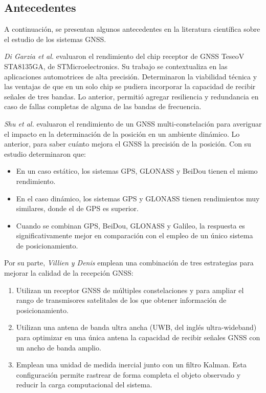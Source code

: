 \subsection{Antecedentes}

A continuación, se presentan algunos antecedentes en la literatura científica sobre el estudio de los sistemas GNSS. 

\textit{Di Garzia et al.} \citep{DiGrazia} evaluaron el rendimiento del chip receptor de GNSS TeseoV STA8135GA, de STMicroelectronics. Su trabajo se contextualiza en las aplicaciones automotrices de alta precisión. Determinaron la viabilidad técnica y las ventajas de que en un solo chip se pudiera incorporar la capacidad de recibir señales de tres bandas. Lo anterior, permitió agregar resiliencia y redundancia en caso de fallas completas de alguna de las bandas de frecuencia. 

\textit{Shu et al.}  \citep{Shu} evaluaron el rendimiento de un GNSS multi-constelación para averiguar el impacto en la determinación de la posición en un ambiente dinámico. Lo anterior, para saber cuánto mejora el GNSS la precisión de la posición. Con su estudio determinaron que:

\begin{itemize}
    \item En un caso estático, los sistemas GPS, GLONASS y BeiDou tienen el mismo rendimiento.
    \item En el caso dinámico, los sistemas GPS y GLONASS tienen rendimientos muy similares, donde el de GPS es superior. 
    \item Cuando se combinan GPS, BeiDou, GLONASS y Galileo, la respuesta es significativamente mejor en comparación con el empleo de un único sistema de posicionamiento. 
\end{itemize}

Por su parte, \textit{Villien y Denis} \citep{Villien} emplean una combinación de tres estrategias para mejorar la calidad de la recepción GNSS:

\begin{enumerate}
    \item Utilizan un receptor GNSS de múltiples constelaciones y para ampliar el rango de transmisores satelitales de los que obtener información de posicionamiento. 
    \item Utilizan una antena de banda ultra ancha (UWB, del inglés ultra-wideband) para optimizar en una única antena la capacidad de recibir señales GNSS con un ancho de banda amplio.
    \item Emplean una unidad de medida inercial junto con un filtro Kalman. Esta configuración permite rastrear de forma completa el objeto observado y reducir la carga computacional del sistema.
\end{enumerate}

